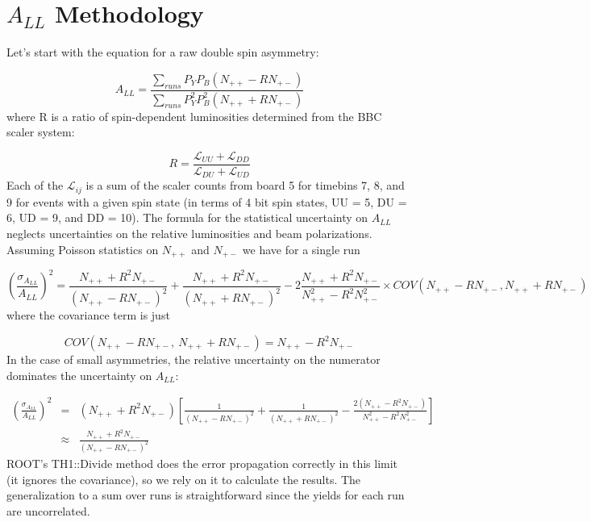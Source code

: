 \section{$A_{LL}$ Methodology}

Let's start with the equation for a raw double spin asymmetry:

\begin{equation}
  A_{LL} = \frac{\sum_{runs} P_{Y}P_{B}(N_{++} - RN_{+-})}{\sum_{runs} P_{Y}^{2}P_{B}^{2}(N_{++} + RN_{+-})}
\end{equation}
%
where R is a ratio of spin-dependent luminosities determined from the BBC scaler system:

\begin{equation}
  R = \frac{\mathcal{L}_{UU}+\mathcal{L}_{DD}}{\mathcal{L}_{DU}+\mathcal{L}_{UD}}
\end{equation}
%
Each of the $\mathcal{L}_{ij}$ is a sum of the scaler counts from board 5 for
timebins 7, 8, and 9 for events with a given spin state (in terms of 4 bit
spin states, UU = 5, DU = 6, UD = 9, and DD = 10). The formula for the
statistical uncertainty on $A_{LL}$ neglects uncertainties on the relative
luminosities and beam polarizations. Assuming Poisson statistics on $N_{++}$
and $N_{+-}$ we have for a single run

\begin{equation}
  \left(\frac{\sigma_{A_{LL}}}{A_{LL}}\right)^2 = \frac{N_{++} + R^2 N_{+-}}{(N_{++} - R N_{+-})^2} + \frac{N_{++} + R^2 N_{+-}}{(N_{++} + R N_{+-})^2} - 2\frac{N_{++} + R^2 N_{+-}}{N_{++}^2 - R^2 N_{+-}^2} \times COV(N_{++} - R N_{+-}, N_{++} + R N_{+-})
\end{equation}
%
where the covariance term is just

\begin{equation}
  COV(N_{++} - R N_{+-},~N_{++} + R N_{+-}) = N_{++} - R^2 N_{+-}
\end{equation}
%
In the case of small asymmetries, the relative uncertainty on the numerator
dominates the uncertainty on $A_{LL}$:

\begin{eqnarray}
  \left(\frac{\sigma_{A_{LL}}}{A_{LL}}\right)^2 & = & \left(N_{++} + R^2 N_{+-}\right) \left[\frac{1}{(N_{++} - R N_{+-})^2} + \frac{1}{(N_{++} + R N_{+-})^2} - \frac{2(N_{++}-R^2 N_{+-})}{N_{++}^2 - R^2 N_{+-}^2} \right] \\
  & \approx & \frac{N_{++} + R^2 N_{+-}}{(N_{++} - R N_{+-})^2}
\end{eqnarray}
%
ROOT's TH1::Divide method does the error propagation correctly in this limit
(it ignores the covariance), so we rely on it to calculate the results. The
generalization to a sum over runs is straightforward since the yields for each
run are uncorrelated.

